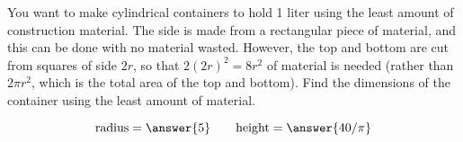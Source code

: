 \documentclass{ximera}
\author{Bart Snapp}
\begin{document}
\begin{exercise}


  You want to make cylindrical containers to hold 1 liter using the
  least amount of construction material.  The side is made from a
  rectangular piece of material, and this can be done with no material
  wasted.  However, the top and bottom are cut from squares of side
  $2r$, so that $2(2r)^2=8r^2$ of material is needed (rather than
  $2\pi r^2$, which is the total area of the top and bottom).  Find
  the dimensions of the container using the least amount of material.
  \begin{prompt}
  \[
  \text{radius}=\answer{5}\qquad\text{height}=\answer{40/\pi}
  \]
  \end{prompt}
\end{exercise}
\end{document}
